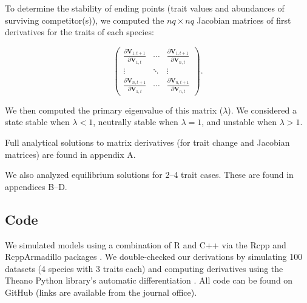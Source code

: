 To determine the stability of ending points (trait values and abundances of
surviving competitor(s)), we computed the $nq \times nq$ Jacobian matrices
of first derivatives for the traits of each species:

\begin{equation} \label{eq:jacobian}
    \begin{pmatrix}
        \frac{\partial \mathbf{V}_{1,t+1}}{\partial \mathbf{V}_{1,t}} & \cdots &
            \frac{\partial \mathbf{V}_{1,t+1}}{\partial \mathbf{V}_{n,t}} \\
        \vdots & \ddots & \vdots \\
        \frac{\partial \mathbf{V}_{n,t+1}}{\partial \mathbf{V}_{1,t}} & \cdots &
            \frac{\partial \mathbf{V}_{n,t+1}}{\partial \mathbf{V}_{n,t}}
    \end{pmatrix}
    \textrm{.}
\end{equation}

\noindent We then computed the primary eigenvalue of this matrix ($\lambda$).
We considered a state stable when $\lambda < 1$,
neutrally stable when $\lambda = 1$,
and unstable when $\lambda > 1$.

Full analytical solutions to matrix derivatives (for trait change and
Jacobian matrices) are found in appendix A.

We also analyzed equilibrium solutions for 2--4 trait cases.
These are found in appendices B--D.


%





\subsection*{Code}

We simulated models using a combination of R \citep{RCoreTeam:2019wf} and
C++ via the Rcpp and RcppArmadillo packages
\citep{Eddelbuettel:2014ad,Eddelbuettel:2013if,Sanderson:2016cs}.
We double-checked our derivations by simulating 100 datasets
(4 species with 3 traits each) and computing derivatives using the Theano Python
library's automatic differentiation \citep{TheanoDevelopmentTeam:2016uc}.
All code can be found on GitHub
(links are available from the journal office).

